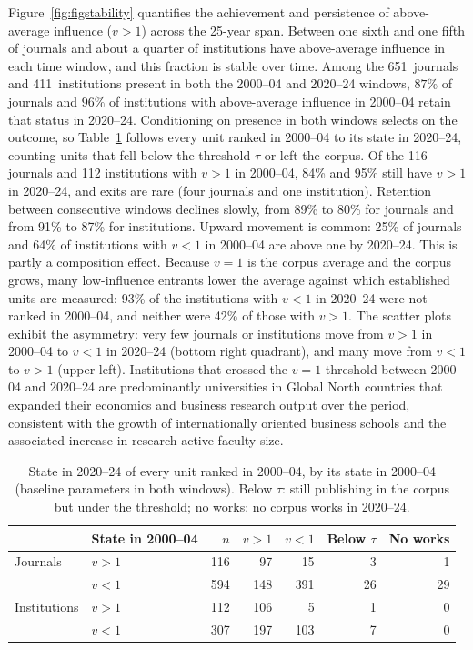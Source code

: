 Figure~\ref{fig:figstability} quantifies the achievement and persistence of
above-average influence ($v>1$) across the 25-year span.
Between one sixth and one fifth of journals and about a quarter of institutions have
above-average influence in each time window, and this fraction is stable over time.
Among the 651~journals and 411~institutions present in both the
2000--04 and 2020--24 windows, $87\%$ of journals and $96\%$ of
institutions with above-average influence in 2000--04 retain that status
in 2020--24. Conditioning on presence in both windows selects on the outcome, so Table~\ref{tab:survivorship} follows every unit ranked in 2000--04 to its state in 2020--24, counting units that fell below the threshold $\tau$ or left the corpus. Of the 116 journals and 112 institutions with $v>1$ in 2000--04, 84\% and 95\% still have $v>1$ in 2020--24, and exits are rare (four journals and one institution). Retention between consecutive windows declines slowly, from 89\% to 80\% for journals and from 91\% to 87\% for institutions. Upward movement is common: 25\% of journals and 64\% of institutions with $v<1$ in 2000--04 are above one by 2020--24. This is partly a composition effect. Because $v=1$ is the corpus average and the corpus grows, many low-influence entrants lower the average against which established units are measured: 93\% of the institutions with $v<1$ in 2020--24 were not ranked in 2000--04, and neither were 42\% of those with $v>1$. The scatter plots exhibit the asymmetry: very few journals or institutions move from
$v>1$ in 2000--04 to $v<1$ in 2020--24 (bottom right quadrant), and many move from $v<1$ to $v>1$
(upper left). Institutions that crossed the $v=1$ threshold between 2000--04 and 2020--24
are predominantly universities in Global North countries that expanded their economics and business research output over the period, consistent with the growth of internationally oriented business schools
and the associated increase in research-active faculty size.

\begin{table}[!htbp]
  \centering
  \small
  \caption{State in 2020--24 of every unit ranked in 2000--04, by its state in 2000--04 (baseline parameters in both windows). Below $\tau$: still publishing in the corpus but under the threshold; no works: no corpus works in 2020--24.}
  \label{tab:survivorship}
  \begin{tabular}{llrrrrr}
    \toprule
    & State in 2000--04 & $n$ & $v>1$ & $v<1$ & Below $\tau$ & No works \\
    \midrule
    Journals     & $v>1$ & 116 &  97 &  15 &  3 &  1 \\
                 & $v<1$ & 594 & 148 & 391 & 26 & 29 \\
    Institutions & $v>1$ & 112 & 106 &   5 &  1 &  0 \\
                 & $v<1$ & 307 & 197 & 103 &  7 &  0 \\
    \bottomrule
  \end{tabular}
\end{table}

